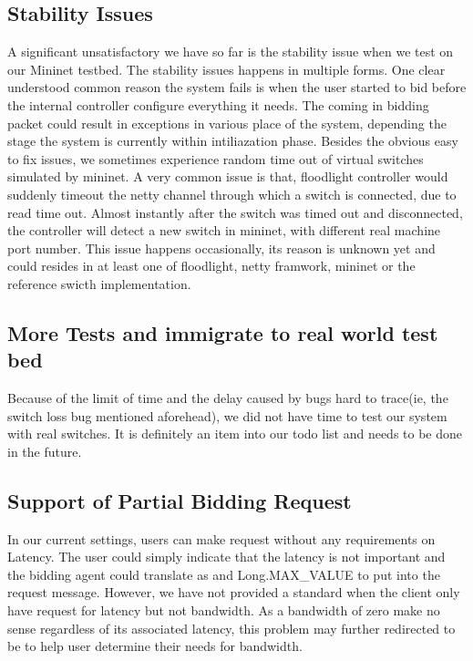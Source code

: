 \documentclass[a4paper,11pt,twocolumn]{article}
\begin{document}
\subsection{Stability Issues}
A significant unsatisfactory we have so far is the stability issue when we test on our Mininet testbed. 
The stability issues happens in multiple forms.  One clear understood common reason the system fails is when the user 
started to bid before the internal controller configure everything it needs. The coming in bidding packet could result in
 exceptions in various place of the system, depending the stage the system is currently within intiliazation phase. 
Besides the obvious easy to fix issues, we sometimes experience random time out of virtual switches simulated by mininet. 
A very common issue is that, floodlight controller would suddenly timeout the netty channel through which a switch is connected, 
due to read time out. Almost instantly after the switch was timed out and disconnected, the controller will detect a new switch 
in mininet, with different real machine port number. This issue happens occasionally, its reason is unknown yet and could resides
 in at least one of floodlight, netty framwork, mininet  or the reference swicth implementation.

\subsection{More Tests and immigrate to real world test bed}
Because of the limit of time and the delay caused by bugs hard to trace(ie, the switch loss bug mentioned aforehead), 
we did not have time to test our system with real switches. It is definitely an item into our todo list and needs to be done in the future.

\subsection{Support of Partial Bidding Request}
In our current settings, users can make request without any requirements on Latency. The user could simply indicate that the latency 
is not important and the bidding agent  could translate as and Long.MAX\_VALUE to put into the request message. However,
 we have not provided a standard when the client only have request for latency but not bandwidth. As a bandwidth of zero make
 no sense regardless of its associated latency, this problem may further redirected to be to help user determine their needs for bandwidth.
\end{document}
